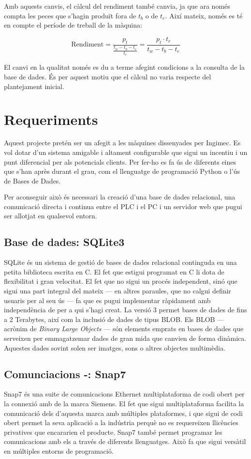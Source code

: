 \documentclass{tfgitic}[2022/06/30]
\begin{document}
Amb aquests canvis, el càlcul del rendiment també canvia, ja que ara només compta les peces que s'hagin produït fora de $t_{b}$ o de $t_{e}$. Així mateix, només es té en compte el període de treball de la màquina:

\[\textrm{Rendiment} = \frac{p_{t}}{\frac{t_{w} - t_{b} - t_{e}}{t_{c}}} = \frac{p_{t} \cdot t_{c}}{t_{w} - t_{b} - t_{e}}\]
\vspace{10px}

El canvi en la qualitat només es du a terme afegint condicions a la consulta de la base de dades. És per aquest motiu que el càlcul no varia respecte del plantejament inicial.

\section{Requeriments}
Aquest projecte pretén ser un afegit a les màquines dissenyades per Ingimec. Es vol dotar d'un sistema amigable i altament configurable que sigui un incentiu i un punt diferencial per als potencials clients. Per fer-ho es fa ús de diferents eines que s'han après durant el grau, com el llenguatge de programació Python o l'ús de Bases de Dades.

Per aconseguir això és necessari la creació d'una base de dades relacional, una comunicació directa i continua entre el PLC i el PC i un servidor web que pugui ser allotjat en qualsevol entorn.

\subsection{Base de dades: SQLite3}
SQLite és un sistema de gestió de bases de dades relacional continguda en una petita biblioteca escrita en C. El fet que estigui programat en C li dota de flexibilitat i gran velocitat. El fet que no sigui un procés independent, sinó que sigui una part integral del mateix --- en altres paraules, que no calgui definir usuaris per al seu ús --- fa que es pugui implementar ràpidament amb independència de per a qui s'hagi creat. La versió 3 permet bases de dades de fins a 2 Terabytes, així com la inclusió de dades de tipus BLOB. Els BLOB --- acrònim de \emph{Binary Large Objects} --- són elements emprats en bases de dades que serveixen per emmagatzemar dades de gran mida que canvien de forma dinàmica. Aquestes dades sovint solen ser imatges, sons o altres objectes multimèdia.

\subsection{Comunciacions -: Snap7}
Snap7 és una suite de comunicacions Ethernet multiplataforma de codi obert per la connexió amb  de la marca Siemens. El fet que sigui multiplataforma facilita la comunicació dels  d'aquesta marca amb múltiples plataformes, i que sigui de codi obert permet la seva aplicació a la indústria perquè no es requereixen llicències privatives que encararien el producte. Snap7 també permet programar les comunicacions amb els  a través de diferents llenguatges. Això fa que sigui versàtil en múltiples entorns de programació.
\end{document}
